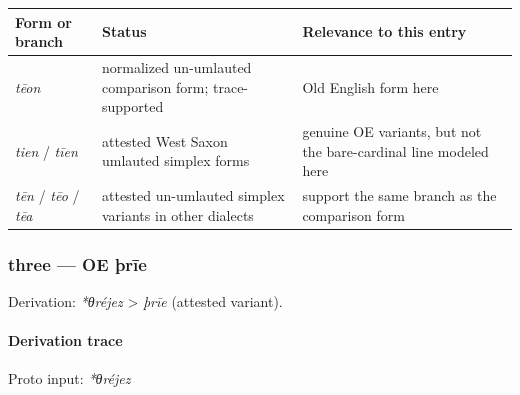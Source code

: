 \documentclass[
  british,
  a4paper,
]{article}
\newcounter{none} %
\begin{document}
{\def\LTcaptype{none} %
\begin{longtable}[]{@{}
  >{\raggedright\arraybackslash}p{}
  >{\raggedright\arraybackslash}p{}
  >{\raggedright\arraybackslash}p{}@{}}
\toprule\noalign{}
\begin{minipage}[b]{\linewidth}\raggedright
Form or branch
\end{minipage} & \begin{minipage}[b]{\linewidth}\raggedright
Status
\end{minipage} & \begin{minipage}[b]{\linewidth}\raggedright
Relevance to this entry
\end{minipage} \\
\midrule\noalign{}
\endhead
\bottomrule\noalign{}
\endlastfoot
\emph{tēon} & normalized un-umlauted comparison form; trace-supported &
Old English form here \\
\emph{tien} / \emph{tīen} & attested West Saxon umlauted simplex forms &
genuine OE variants, but not the bare-cardinal line modeled here \\
\emph{tēn} / \emph{tēo} / \emph{tēa} & attested un-umlauted simplex
variants in other dialects & support the same branch as the comparison
form \\
\end{longtable}
}

\subsubsection{three --- OE þrīe}\label{three-oe-uxferux12be}

Derivation: \emph{*θréjez} \textgreater{} \emph{þrīe} (attested
variant).

\paragraph{Derivation trace}\label{derivation-trace-2}

Proto input: \emph{*θréjez}

\begingroup
\setlength{\fboxsep}{6pt}
\end{document}
